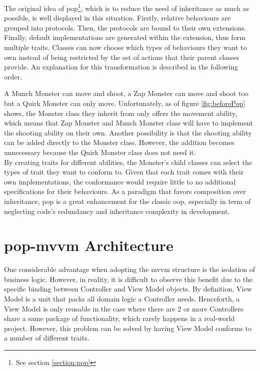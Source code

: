 \documentclass[11pt,a4paper,oneside,article]{memoir}
\begin{document}
The original idea of \gls{pop}\footnote{See section \ref{section:pop}}, which is to reduce the need of inheritance as much as possible, is well displayed in this situation. Firstly, relative behaviours are grouped into protocols. Then, the protocols are bound to their own extensions. Finally, default implementations are generated within the extension, thus form multiple \glspl{trait}. Classes can now choose which types of behaviours they want to own instead of being restricted by the set of actions that their parent classes provide. An explanation for this transformation is described in the following order.

A Munch Monster can move and shoot, a Zap Monster can move and shoot too but a Quirk Monster can only move. Unfortunately, as of figure \ref{fig:beforePop} shows, the Monster class they inherit from only offers the movement ability, which means that Zap Monster and Munch Monster class will have to implement the shooting ability on their own. Another possibility is that the shooting ability can be added directly to the Monster class. However, the addition becomes unnecessary %
because the Quirk Monster class does not need it. \\
By creating \glspl{trait} for different abilities, the Monster's child classes can select the types of \gls{trait} they want to conform to. Given that each trait comes with their own implementations, the conformance would require little to no additional specifications for their behaviours. As a paradigm that favors composition over inheritance, \gls{pop} is a great enhancement for the classic \gls{oop}, especially in term of neglecting code's redundancy and inheritance complexity in development. 

\section{\acrlong{pop-mvvm} Architecture} 
One considerable advantage when adopting the \gls{mvvm} structure is the isolation of business logic. However, in reality, it is difficult to observe this benefit due to the specific binding between Controller and View Model objects. By definition, View Model is a unit that packs all domain logic a Controller needs. Henceforth, a View Model is only reusable in the case where there are 2 or more Controllers share a same package of functionality, which rarely happens in a real-world project. However, this problem can be solved by having View Model conforms to a number of different \glspl{trait}.
\end{document}
